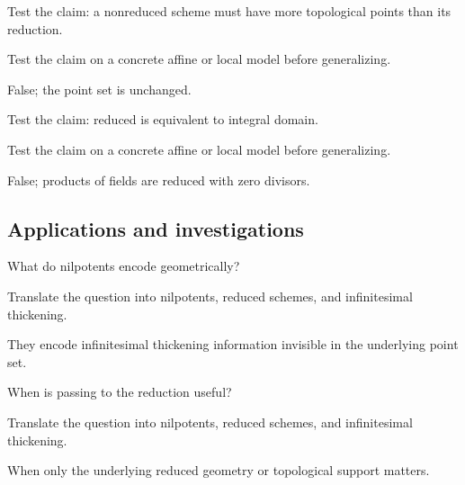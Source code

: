 \begin{exercise}\label{exr:vi10-expand-11}
Test the claim: a nonreduced scheme must have more topological points than its reduction.
\end{exercise}
\begin{hint}
Test the claim on a concrete affine or local model before generalizing.
\end{hint}
\begin{solution}
False; the point set is unchanged.
\end{solution}

\begin{exercise}\label{exr:vi10-expand-12}
Test the claim: reduced is equivalent to integral domain.
\end{exercise}
\begin{hint}
Test the claim on a concrete affine or local model before generalizing.
\end{hint}
\begin{solution}
False; products of fields are reduced with zero divisors.
\end{solution}

\subsection*{Applications and investigations}

\begin{exercise}[Infinitesimals]\label{exr:vi10-expand-13}
What do nilpotents encode geometrically?
\end{exercise}
\begin{hint}
Translate the question into nilpotents, reduced schemes, and infinitesimal thickening.
\end{hint}
\begin{solution}
They encode infinitesimal thickening information invisible in the underlying point set.
\end{solution}

\begin{exercise}[Simplification]\label{exr:vi10-expand-14}
When is passing to the reduction useful?
\end{exercise}
\begin{hint}
Translate the question into nilpotents, reduced schemes, and infinitesimal thickening.
\end{hint}
\begin{solution}
When only the underlying reduced geometry or topological support matters.
\end{solution}

